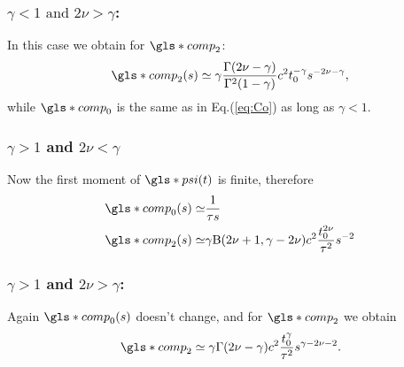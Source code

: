 \subsubsection{$\gamma<1 \text{ and } 2\nu>\gamma$: }
In this case we obtain for $\gls*{comp}_2$:
\begin{equation}
  \gls*{comp}_2(s) \simeq  \gamma   \frac{\Gamma(2\nu-\gamma)}{\Gamma^2(1-\gamma)} c^2 t_0^{-\gamma} s^{-2\nu-\gamma},
\end{equation}
while $\gls*{comp}_0$ is the same as in Eq.(\ref{eq:Co}) as long as $\gamma<1$.

\subsubsection{$\gamma>1$ and  $2\nu<\gamma$}
Now the first moment of $\gls*{psi}(t)$ is finite, therefore 
\begin{align}
 \gls*{comp}_0(s) \simeq &  \frac{1}{\tau s}  \\
 \gls*{comp}_2(s) \simeq & \gamma \mathrm{B}(2\nu+1,\gamma-2\nu) c^2 \frac{t_0^{2\nu}}{\tau^2}  s^{-2}
\end{align}


\subsubsection{$\gamma>1$ and $2\nu>\gamma$: }
Again $\gls*{comp}_0(s)$ doesn't change, and for $\gls*{comp}_2$ we obtain
\begin{equation}
\gls*{comp}_2 \simeq  \gamma \Gamma(2\nu-\gamma)  c^2 \frac{t_0^\gamma}{\tau^2}   s^{\gamma-2\nu -2} .
\end{equation}

